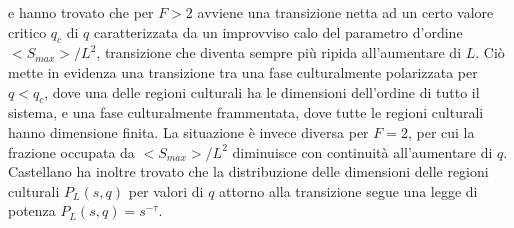 \documentclass[a4paper,12pt]{article}
\begin{document}
e hanno trovato che per $F>2$ avviene una transizione netta ad un certo valore critico $q_c$ di $q$ caratterizzata da un
improvviso calo del parametro d'ordine $<S_{max}>/L^2$, transizione che diventa sempre pi\`{u} ripida all'aumentare di $L$.
Ci\`{o} mette in evidenza una transizione tra una fase culturalmente polarizzata per $q<q_c$, dove una delle regioni culturali ha
le dimensioni dell'ordine di tutto il sistema, e una fase culturalmente frammentata, dove tutte le regioni culturali hanno dimensione finita.
La situazione \`{e} invece diversa per $F=2$, per cui la frazione occupata da $<S_{max}>/L^2$ diminuisce con continuit\`{a} all'aumentare di $q$.
Castellano ha inoltre trovato che la distribuzione delle dimensioni delle regioni culturali $P_L(s,q)$ per valori di $q$ attorno alla transizione
segue una legge di potenza $P_L(s,q) = s^{-\tau}$.
\end{document}

